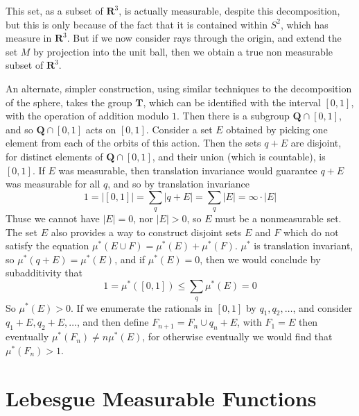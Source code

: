 This set, as a subset of $\mathbf{R}^3$, is actually measurable, despite this decomposition, but this is only because of the fact that it is contained within $S^2$, which has measure in $\mathbf{R}^3$. But if we now consider rays through the origin, and extend the set $M$ by projection into the unit ball, then we obtain a true non measurable subset of $\mathbf{R}^3$.

An alternate, simpler construction, using similar techniques to the decomposition of the sphere, takes the group $\mathbf{T}$, which can be identified with the interval $[0,1]$, with the operation of addition modulo $1$. Then there is a subgroup $\mathbf{Q} \cap [0,1]$, and so $\mathbf{Q} \cap [0,1]$ acts on $[0,1]$. Consider a set $E$ obtained by picking one element from each of the orbits of this action. Then the sets $q + E$ are disjoint, for distinct elements of $\mathbf{Q} \cap [0,1]$, and their union (which is countable), is $[0,1]$. If $E$ was measurable, then translation invariance would guarantee $q + E$ was measurable for all $q$, and so by translation invariance
%
\[ 1 = |[0,1]| = \sum_q |q + E| = \sum_q |E| = \infty \cdot |E| \]
%
Thuse we cannot have $|E| = 0$, nor $|E| > 0$, so $E$ must be a nonmeasurable set. The set $E$ also provides a way to construct disjoint sets $E$ and $F$ which do not satisfy the equation $\mu^*(E \cup F) = \mu^*(E) + \mu^*(F)$. $\mu^*$ is translation invariant, so $\mu^*(q + E) = \mu^*(E)$, and if $\mu^*(E) = 0$, then we would conclude by subadditivity that
%
\[ 1 = \mu^*([0,1]) \leq \sum_q \mu^*(E) = 0 \]
%
So $\mu^*(E) > 0$. If we enumerate the rationals in $[0,1]$ by $q_1, q_2, \dots$, and consider $q_1 + E, q_2 + E, \dots$, and then define $F_{n+1} = F_n \cup q_n + E$, with $F_1 = E$ then eventually $\mu^*(F_n) \neq n \mu^*(E)$, for otherwise eventually we would find that $\mu^*(F_n) > 1$.

\chapter{Lebesgue Measurable Functions}

